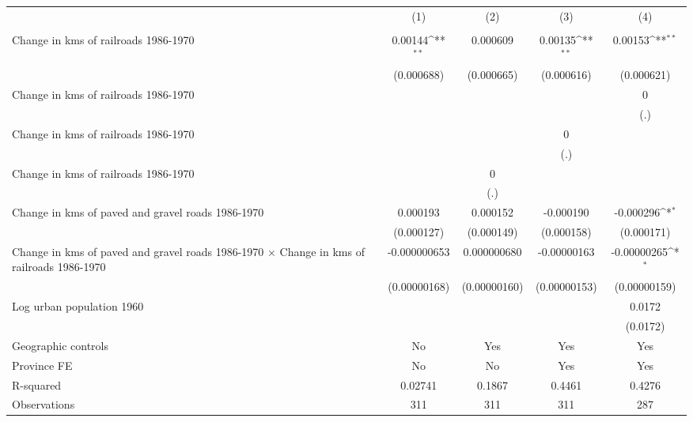 {
\def\sym#1{\ifmmode^{#1}\else\(^{#1}\)\fi}
\begin{tabular}{l*{4}{c}}
\hline\hline
                &\multicolumn{1}{c}{(1)}&\multicolumn{1}{c}{(2)}&\multicolumn{1}{c}{(3)}&\multicolumn{1}{c}{(4)}\\
                &\multicolumn{1}{c}{}&\multicolumn{1}{c}{}&\multicolumn{1}{c}{}&\multicolumn{1}{c}{}\\
\hline
Change in kms of railroads 1986-1970&  0.00144\sym{**} & 0.000609         &  0.00135\sym{**} &  0.00153\sym{**} \\
                &(0.000688)         &(0.000665)         &(0.000616)         &(0.000621)         \\
[1em]
Change in kms of railroads 1986-1970&                  &                  &                  &        0         \\
                &                  &                  &                  &      (.)         \\
[1em]
Change in kms of railroads 1986-1970&                  &                  &        0         &                  \\
                &                  &                  &      (.)         &                  \\
[1em]
Change in kms of railroads 1986-1970&                  &        0         &                  &                  \\
                &                  &      (.)         &                  &                  \\
[1em]
Change in kms of paved and gravel roads 1986-1970& 0.000193         & 0.000152         &-0.000190         &-0.000296\sym{*}  \\
                &(0.000127)         &(0.000149)         &(0.000158)         &(0.000171)         \\
[1em]
Change in kms of paved and gravel roads 1986-1970 $\times$ Change in kms of railroads 1986-1970&-0.000000653         &0.000000680         &-0.00000163         &-0.00000265\sym{*}  \\
                &(0.00000168)         &(0.00000160)         &(0.00000153)         &(0.00000159)         \\
[1em]
Log urban population 1960&                  &                  &                  &   0.0172         \\
                &                  &                  &                  & (0.0172)         \\
\hline
Geographic controls&       No         &      Yes         &      Yes         &      Yes         \\
Province FE     &       No         &       No         &      Yes         &      Yes         \\
R-squared       &  0.02741         &   0.1867         &   0.4461         &   0.4276         \\
Observations    &      311         &      311         &      311         &      287         \\
\hline\hline
\end{tabular}
}
